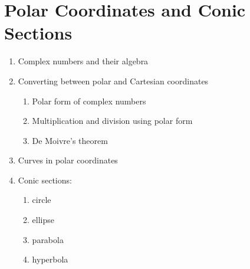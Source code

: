 
\chapter{Polar Coordinates and Conic Sections}

\begin{enumerate}
\item Complex numbers and their algebra

\item Converting between polar and Cartesian coordinates
  \begin{enumerate}
  \item Polar form of complex numbers

  \item Multiplication and division using polar form

  \item De Moivre's theorem
  \end{enumerate}

\item Curves in polar coordinates

\item Conic sections:
  \begin{enumerate}
  \item circle

  \item ellipse

  \item parabola

  \item hyperbola
  \end{enumerate}
\end{enumerate}
